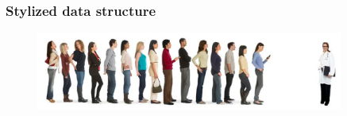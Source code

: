 \documentclass[11pt,table]{beamer}
\begin{document}
\begin{frame}\frametitle{Stylized data structure}
\renewcommand{\baselinestretch}{1}
\begin{figure}[h]
\begin{center}
{\includegraphics[width=0.9\textwidth]{figures/queue.png}}
\end{center}
\end{figure}
\begin{columns} 

    \begin{column}{.55\textwidth}       \vspace{-2ex}


\end{column}
\end{columns}
\end{frame}
\end{document}
